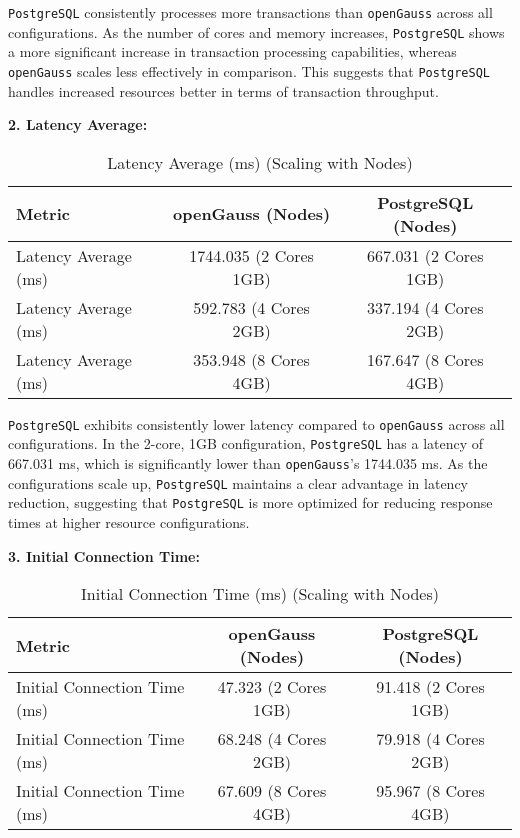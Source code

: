 \documentclass[12pt,a4paper,cs4size]{ctexart}
\begin{document}
\texttt{PostgreSQL} consistently processes more transactions than \texttt{openGauss} across all configurations. As the number of cores and memory increases, \texttt{PostgreSQL} shows a more significant increase in transaction processing capabilities, whereas \texttt{openGauss} scales less effectively in comparison. This suggests that \texttt{PostgreSQL} handles increased resources better in terms of transaction throughput.


\textbf{2. Latency Average:}

\begin{table}[h!]
\centering
\captionsetup{labelformat=empty}
\begin{tabular}{|l|c|c|}
\hline
\textbf{Metric} & \textbf{openGauss (Nodes)} & \textbf{PostgreSQL (Nodes)} \\
\hline
Latency Average (ms) & 1744.035 (2 Cores 1GB) & 667.031 (2 Cores 1GB) \\
\hline
Latency Average (ms) & 592.783 (4 Cores 2GB) & 337.194 (4 Cores 2GB) \\
\hline
Latency Average (ms) & 353.948 (8 Cores 4GB) & 167.647 (8 Cores 4GB) \\
\hline
\end{tabular}
\caption{Latency Average (ms) (Scaling with Nodes)}
\end{table}

\texttt{PostgreSQL} exhibits consistently lower latency compared to \texttt{openGauss} across all configurations. In the 2-core, 1GB configuration, \texttt{PostgreSQL} has a latency of 667.031 ms, which is significantly lower than \texttt{openGauss}'s 1744.035 ms. As the configurations scale up, \texttt{PostgreSQL} maintains a clear advantage in latency reduction, suggesting that \texttt{PostgreSQL} is more optimized for reducing response times at higher resource configurations.

\textbf{3. Initial Connection Time:}

\begin{table}[h!]
\centering
\captionsetup{labelformat=empty}
\begin{tabular}{|l|c|c|}
\hline
\textbf{Metric} & \textbf{openGauss (Nodes)} & \textbf{PostgreSQL (Nodes)} \\
\hline
Initial Connection Time (ms) & 47.323 (2 Cores 1GB) & 91.418 (2 Cores 1GB) \\
\hline
Initial Connection Time (ms) & 68.248 (4 Cores 2GB) & 79.918 (4 Cores 2GB) \\
\hline
Initial Connection Time (ms) & 67.609 (8 Cores 4GB) & 95.967 (8 Cores 4GB) \\
\hline
\end{tabular}
\caption{Initial Connection Time (ms) (Scaling with Nodes)}
\end{table}
\end{document}
